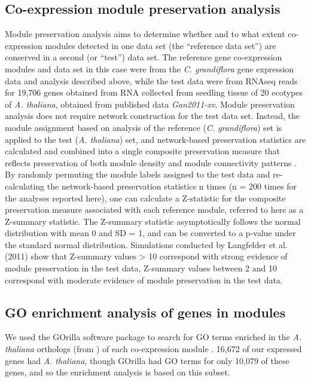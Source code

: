 \subsection{Co-expression module preservation analysis}
Module preservation analysis aims to determine whether and to what extent co-expression modules detected in one data set (the “reference data set”) are conserved in a second (or “test”) data set. The reference gene co-expression modules and data set in this case were from the \textit{C. grandiflora} gene expression data and analysis described above, while the test data were from RNAseq reads for 19,706 genes obtained from RNA collected from seedling tissue of 20 ecotypes of \textit{A. thaliana}, obtained from published data \textit{Gan2011-xv}. Module preservation analysis does not require network construction for the test data set. Instead, the module assignment based on analysis of the reference (\textit{C. grandiflora}) set is applied to the test (\textit{A. thaliana}) set, and network-based preservation statistics are calculated and combined into a single composite preservation measure that reflects preservation of both module density and module connectivity patterns \citep{langfelder2011}. By randomly permuting the module labels assigned to the test data and re-calculating the network-based preservation statistics n times (n = 200 times for the analyses reported here), one can calculate a Z-statistic for the composite preservation measure associated with each reference module, referred to here as a Z-summary statistic.  The Z-summary statistic asymptotically follows the normal distribution with mean 0 and SD = 1, and can be converted to a p-value under the standard normal distribution.  Simulations conducted by Langfelder et al. (2011) show that Z-summary values > 10 correspond with strong evidence of module preservation in the test data, Z-summary values between 2 and 10 correspond with moderate evidence of module preservation in the test data.

\subsection{GO enrichment analysis of genes in modules}
We used the GOrilla software package to search for GO terms enriched in the \textit{A. thaliana} orthologs (from \citep{Williamson2014-tf}) of each co-expression module \citep{Eden2009-hl}. 16,672 of our expressed genes had \textit{A. thaliana}, though GOrilla had GO terms for only 10,079 of these genes, and so the enrichment analysis is based on this subset.

